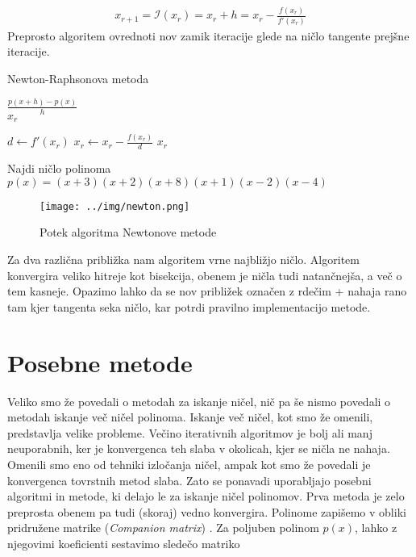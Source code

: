 \begin{align}
    x_{r+1} = \mathcal{I}(x_{r}) = x_{r} + h =  x_{r} - \frac{f(x_r)}{f'(x_r)}
\end{align}
Preprosto algoritem ovrednoti nov zamik iteracije glede na ničlo tangente prejšne iteracije.
\begin{algorithm}[H]
\caption{Newton-Raphsonova metoda}
\begin{algorithmic}



 
    \State \Return $\frac{p(x + h) - p(x)}{h}$ 
\EndProcedure\\
\Require $x_r$

 
    \State $d \gets f'(x_r)$ 
    \State $x_r \gets x_r - \frac{f(x_r)}{d}$
\EndWhile 
\State  \Return $x_r$
\EndProcedure
\end{algorithmic}
\end{algorithm}
\newpage
\begin{primer}
    Najdi ničlo polinoma $p(x) = (x+3)(x+2)(x+8)(x+1)(x-2)(x-4)$
    \begin{figure}[H]
    \centering
    \texttt{[image: ../img/newton.png]}
    \caption{Potek algoritma Newtonove metode}
    \label{fig:newtons}
\end{figure}
    Za dva različna približka nam algoritem vrne najbližjo ničlo. Algoritem konvergira veliko hitreje kot bisekcija, obenem je  ničla tudi natančnejša, a več o tem kasneje. Opazimo lahko da se nov približek označen z rdečim + nahaja rano tam kjer tangenta seka ničlo, kar potrdi pravilno implementacijo metode.
\end{primer}
\section{Posebne metode}
Veliko smo že povedali o metodah za iskanje ničel, nič pa še nismo povedali o metodah iskanje več ničel polinoma. Iskanje več ničel, kot smo že omenili, predstavlja velike probleme. Večino iterativnih algoritmov je bolj ali manj neuporabnih, ker je konvergenca teh slaba v okolicah, kjer se ničla ne nahaja. Omenili smo eno od tehniki izločanja ničel, ampak kot smo že povedali je konvergenca tovrstnih metod slaba. Zato se ponavadi uporabljajo posebni algoritmi in metode, ki delajo le za iskanje ničel polinomov. Prva metoda je zelo preprosta obenem pa tudi (skoraj) vedno konvergira. Polinome zapišemo v obliki pridružene matrike (\textit{Companion matrix}) \cite{Plestenjak2010}. Za poljuben polinom $p(x)$, lahko z njegovimi koeficienti sestavimo sledečo matriko

